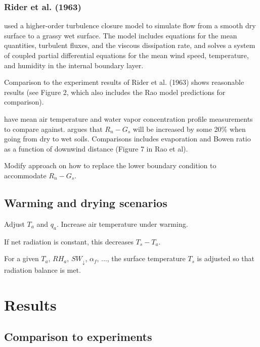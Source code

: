 \documentclass{article}
\begin{document}
    
    \subsubsection*{Rider et al. (1963)} \citet{rao1974local} used a higher-order turbulence closure model to simulate flow from a smooth dry surface to a grassy wet surface. The model includes equations for the mean quantities, turbulent fluxes, and the viscous dissipation rate, and solves a system of coupled partial differential equations for the mean wind speed, temperature, and humidity in the internal boundary layer.

    Comparison to the experiment results of Rider et al. (1963) shows reasonable results
    (see Figure 2, which also includes the Rao model predictions for comparison).

    \citet{rider1963horizontal} have mean air temperature and water vapor concentration profile measurements to compare against. \citet{rao1974local} argues that $R_n - G_s$ will be increased by some 20\% when going from dry to wet soils. Comparisons includes evaporation and Bowen ratio as a function of downwind distance  (Figure 7 in Rao et al).

    Modify approach on how to replace the lower boundary condition to accommodate $R_n-G_s$.  

    \subsection{Warming and drying scenarios} 

    Adjust $T_a$ and $q_a$.     
    Increase air temperature under warming.

    If net radiation is constant, this decreases $T_s - T_a$. 

    For a given $T_a$, $RH_a$, $SW_{\downarrow}$, $\alpha_f$, ..., 
    the surface temperature $T_s$ is adjusted so that radiation balance is met.

    \section{Results}

    
    \subsection{Comparison to experiments}

    
\end{document}
